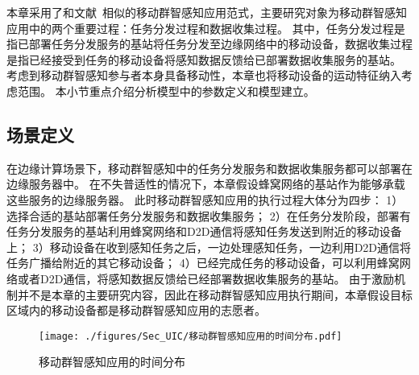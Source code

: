 本章采用了和文献~相似的移动群智感知应用范式，主要研究对象为移动群智感知应用中的两个重要过程：任务分发过程和数据收集过程。
其中，任务分发过程是指已部署任务分发服务的基站将任务分发至边缘网络中的移动设备，数据收集过程是指已经接受到任务的移动设备将感知数据反馈给已部署数据收集服务的基站。
考虑到移动群智感知参与者本身具备移动性，本章也将移动设备的运动特征纳入考虑范围。
本小节重点介绍分析模型中的参数定义和模型建立。

\subsection{场景定义}
\label{UIC:Scenario}


在边缘计算场景下，移动群智感知中的任务分发服务和数据收集服务都可以部署在边缘服务器中。
在不失普适性的情况下，本章假设蜂窝网络的基站作为能够承载这些服务的边缘服务器。
此时移动群智感知应用的执行过程大体分为四步：
1）选择合适的基站部署任务分发服务和数据收集服务；
2）在任务分发阶段，部署有任务分发服务的基站利用蜂窝网络和D2D通信将感知任务发送到附近的移动设备上；
3）移动设备在收到感知任务之后，一边处理感知任务，一边利用D2D通信将任务广播给附近的其它移动设备；
4）已经完成任务的移动设备，可以利用蜂窝网络或者D2D通信，将感知数据反馈给已经部署数据收集服务的基站。
由于激励机制并不是本章的主要研究内容，因此在移动群智感知应用执行期间，本章假设目标区域内的移动设备都是移动群智感知应用的志愿者。

\begin{figure}[!h]
  \centering
  \texttt{[image: ./figures/Sec\_UIC/移动群智感知应用的时间分布.pdf]}
  \vspace{-0.5em}
  \caption{移动群智感知应用的时间分布}
  \label{Figure_MCS_Delay}
\end{figure}

